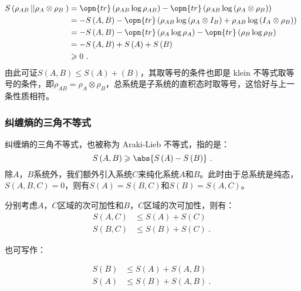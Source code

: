 \begin{equation}
\begin{aligned}
S\left(\rho_{AB}\left|\left|\rho_A\otimes\rho_B\right.\right.\right)&= \opn{tr}\left(\rho_{AB}\log\rho_{AB}\right) - \opn{tr}\left(\rho_{AB}\log\left(\rho_A\otimes\rho_B\right)\right) \\
&= -S\left(A,B\right) - \opn{tr}\left(\rho_{AB}\log\left(\rho_A\otimes I_B\right) + \rho_{AB}\log\left(I_A\otimes\rho_B\right)\right) \\
&= -S\left(A,B\right) - \opn{tr}\left(\rho_A\log\rho_A\right) - \opn{tr}\left(\rho_B\log\rho_B\right) \\
&= -S\left(A,B\right) + S\left(A\right) + S\left(B\right) \\
&\geqslant 0~.
\end{aligned}~
\end{equation}
由此可证$S\left(A,B\right)\leqslant S\left(A\right) + \left(B\right)$，其取等号的条件也即是 klein 不等式取等号的条件，即$\rho_{AB} = \rho_A\otimes \rho_B$，总系统是子系统的直积态时取等号，这恰好与上一条性质相符。

\subsubsection{纠缠熵的三角不等式}

纠缠熵的三角不等式，也被称为 Araki-Lieb 不等式，指的是：
\begin{equation}
S\left(A,B\right)\geqslant\abs{S\left(A\right) - S\left(B\right)}~.
\end{equation}
除$A$，$B$系统外，我们额外引入系统$C$来纯化系统$A$和$B$。此时由于总系统是纯态，$S\left(A,B,C\right) = 0$，则有$S\left(A\right) = S\left(B,C\right)$和$S\left(B\right) = S\left(A,C\right)$。

分别考虑$A$，$C$区域的次可加性和$B$，$C$区域的次可加性，则有：
\begin{equation}
\begin{aligned}
S\left(A,C\right)&\leqslant S\left(A\right)+S\left(C\right) \\
S\left(B,C\right)&\leqslant S\left(B\right)+S\left(C\right)~.
\end{aligned}~
\end{equation}

也可写作：

\begin{equation}
\begin{aligned}
S\left(B\right)&\leqslant S\left(A\right) + S\left(A,B\right) \\
S\left(A\right)&\leqslant S\left(B\right) + S\left(A,B\right)~.
\end{aligned}~
\end{equation}

